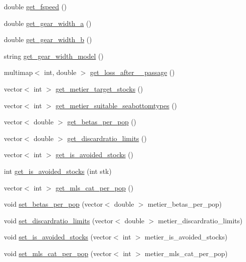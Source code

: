 \begin{DoxyCompactItemize}
\item 
double \mbox{\hyperlink{class_metier_ac3c1439e51f18f03eb963a5f5203cc4b}{get\+\_\+fspeed}} ()
\item 
double \mbox{\hyperlink{class_metier_a8d2006fc0d386f562824b85b9783ee30}{get\+\_\+gear\+\_\+width\+\_\+a}} ()
\item 
double \mbox{\hyperlink{class_metier_a4d3288ee6a2f5cb418ce7df47481db32}{get\+\_\+gear\+\_\+width\+\_\+b}} ()
\item 
string \mbox{\hyperlink{class_metier_a5d13c4593a42653746f3a84397c9613a}{get\+\_\+gear\+\_\+width\+\_\+model}} ()
\item 
multimap$<$ int, double $>$ \mbox{\hyperlink{class_metier_a52d2fd0d7c168bec25f9d9b261f299ab}{get\+\_\+loss\+\_\+after\+\_\+\_\+passage}} ()
\item 
vector$<$ int $>$ \mbox{\hyperlink{class_metier_a06cc08e98f6c0cdfaedf181fa64d04ed}{get\+\_\+metier\+\_\+target\+\_\+stocks}} ()
\item 
vector$<$ int $>$ \mbox{\hyperlink{class_metier_a447ea847feb05695f054f0d4b5b8597b}{get\+\_\+metier\+\_\+suitable\+\_\+seabottomtypes}} ()
\item 
vector$<$ double $>$ \mbox{\hyperlink{class_metier_a5199057d6e45199dd30ecc74963a28c5}{get\+\_\+betas\+\_\+per\+\_\+pop}} ()
\item 
vector$<$ double $>$ \mbox{\hyperlink{class_metier_aaaa86cca255c7b6b38d6b372a9895df8}{get\+\_\+discardratio\+\_\+limits}} ()
\item 
vector$<$ int $>$ \mbox{\hyperlink{class_metier_aff78d2e35871a94a165ee73d3d744a6a}{get\+\_\+is\+\_\+avoided\+\_\+stocks}} ()
\item 
int \mbox{\hyperlink{class_metier_a59dac52ffca8180db8a427d195e1ad9f}{get\+\_\+is\+\_\+avoided\+\_\+stocks}} (int stk)
\item 
vector$<$ int $>$ \mbox{\hyperlink{class_metier_a524fb356a8920462a4fa72d46a35292b}{get\+\_\+mls\+\_\+cat\+\_\+per\+\_\+pop}} ()
\item 
void \mbox{\hyperlink{class_metier_ab0725c7f6fd11e981b99dcbaa463c25e}{set\+\_\+betas\+\_\+per\+\_\+pop}} (vector$<$ double $>$ metier\+\_\+betas\+\_\+per\+\_\+pop)
\item 
void \mbox{\hyperlink{class_metier_ab333208a15ecca3f3de9a5190306781a}{set\+\_\+discardratio\+\_\+limits}} (vector$<$ double $>$ metier\+\_\+discardratio\+\_\+limits)
\item 
void \mbox{\hyperlink{class_metier_a6a4d59a7efd6d987e81426bac5e86ef0}{set\+\_\+is\+\_\+avoided\+\_\+stocks}} (vector$<$ int $>$ metier\+\_\+is\+\_\+avoided\+\_\+stocks)
\item 
void \mbox{\hyperlink{class_metier_a85ca2f66e685ad4745fb8dc09e5624ce}{set\+\_\+mls\+\_\+cat\+\_\+per\+\_\+pop}} (vector$<$ int $>$ metier\+\_\+mls\+\_\+cat\+\_\+per\+\_\+pop)
\end{DoxyCompactItemize}


